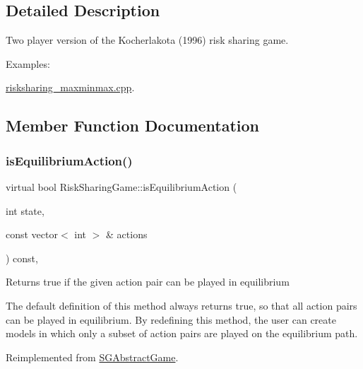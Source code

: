 \subsection{Detailed Description}
Two player version of the Kocherlakota (1996) risk sharing game. \begin{Desc}
\item[Examples\+: ]\par
\hyperlink{risksharing_maxminmax_8cpp-example}{risksharing\+\_\+maxminmax.\+cpp}.\end{Desc}


\subsection{Member Function Documentation}
\mbox{\label{classRiskSharingGame_a7da6b669317562cd9df8dfc0f8226b4c}} 
\subsubsection{\texorpdfstring{is\+Equilibrium\+Action()}{isEquilibriumAction()}}
{\footnotesize\ttfamily virtual bool Risk\+Sharing\+Game\+::is\+Equilibrium\+Action (\begin{DoxyParamCaption}\item[{int}]{state,  }\item[{const vector$<$ int $>$ \&}]{actions }\end{DoxyParamCaption}) const\hspace{0.3cm}{\ttfamily [inline]}, {\ttfamily [virtual]}}

Returns true if the given action pair can be played in equilibrium

The default definition of this method always returns true, so that all action pairs can be played in equilibrium. By redefining this method, the user can create models in which only a subset of action pairs are played on the equilibrium path. 

Reimplemented from \hyperlink{classSGAbstractGame_a2cec8147c3055cfe6314da349d1a7344}{S\+G\+Abstract\+Game}.

\mbox{\label{classRiskSharingGame_a2aed9769b6518ed68b0c595629fb0129}} 
